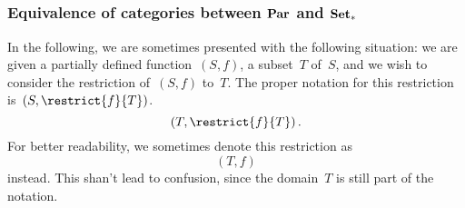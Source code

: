 \subsection{}



\subsubsection*{Equivalence of categories between \texorpdfstring{$\mathbf{Par}$}{Par} and \texorpdfstring{$\mathbf{Set}_*$}{Set\_*}}

In the following, we are sometimes presented with the following situation:
we are given a partially defined function~$(S, f)$, a subset~$T$ of~$S$, and we wish to consider the restriction of~$(S, f)$ to~$T$.
The proper notation for this restriction is~$(S, \restrict{f}{T})$.
\[
	(T, \restrict{f}{T}) \,.
\]
For better readability, we sometimes denote this restriction as
\[
	(T, f)
\]
instead.
This shan’t lead to confusion, since the domain~$T$ is still part of the notation.

